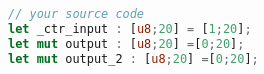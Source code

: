 \documentclass{article}
\newcommand{\rustfrom}[2]
           {}
\begin{document}
\begin{lstlisting}[language=Rust]
// your source code
let _ctr_input : [u8;20] = [1;20];
let mut output : [u8;20] =[0;20];
let mut output_2 : [u8;20] =[0;20];
\end{lstlisting}

\rustfrom{sandbox/aes_ctr/src/main.rs}{test}
\end{document}
